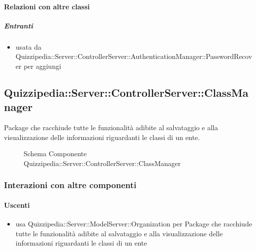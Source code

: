 \paragraph{Relazioni con altre classi}
\subparagraph{Entranti}
\begin{itemize}
\item usata da Quizzipedia::Server::ControllerServer::AuthenticationManager::PasswordRecover per aggiungi
\end{itemize}
\subsection{Quizzipedia::Server::ControllerServer::ClassManager}
Package che racchiude tutte le funzionalità adibite al salvataggio e alla visualizzazione delle informazioni riguardanti le classi di un ente.
\begin{figure}[H]
\centering
\noindent{}
\caption[Schema Componente Quizzipedia::Server::ControllerServer::ClassManager]{Schema Componente Quizzipedia::Server::ControllerServer::ClassManager}
\end{figure}
\subsubsection{Interazioni con altre componenti}
\paragraph{Uscenti}
\begin{itemize}
\item usa Quizzipedia::Server::ModelServer::Organization per Package che racchiude tutte le funzionalità adibite al salvataggio e alla visualizzazione delle informazioni riguardanti le classi di un ente
\end{itemize}

